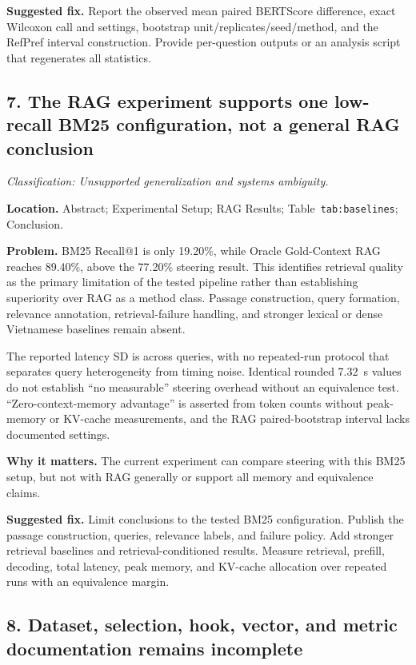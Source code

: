 \documentclass[11pt]{article}
\newcommand{\findinglabel}[1]{\textbf{#1}}
\newcommand{\classification}[1]{\textit{Classification: #1.}}
\begin{document}
\findinglabel{Suggested fix.} Report the observed mean paired BERTScore difference, exact Wilcoxon call and settings, bootstrap unit/replicates/seed/method, and the RefPref interval construction.  Provide per-question outputs or an analysis script that regenerates all statistics.

\subsection*{7. The RAG experiment supports one low-recall BM25 configuration, not a general RAG conclusion}

\classification{Unsupported generalization and systems ambiguity}

\findinglabel{Location.} Abstract; Experimental Setup; RAG Results; Table~\texttt{tab:baselines}; Conclusion.

\findinglabel{Problem.} BM25 Recall@1 is only 19.20\%, while Oracle Gold-Context RAG reaches 89.40\%, above the 77.20\% steering result.  This identifies retrieval quality as the primary limitation of the tested pipeline rather than establishing superiority over RAG as a method class.  Passage construction, query formation, relevance annotation, retrieval-failure handling, and stronger lexical or dense Vietnamese baselines remain absent.

The reported latency SD is across queries, with no repeated-run protocol that separates query heterogeneity from timing noise.  Identical rounded 7.32~s values do not establish ``no measurable'' steering overhead without an equivalence test.  ``Zero-context-memory advantage'' is asserted from token counts without peak-memory or KV-cache measurements, and the RAG paired-bootstrap interval lacks documented settings.

\findinglabel{Why it matters.} The current experiment can compare steering with this BM25 setup, but not with RAG generally or support all memory and equivalence claims.

\findinglabel{Suggested fix.} Limit conclusions to the tested BM25 configuration.  Publish the passage construction, queries, relevance labels, and failure policy.  Add stronger retrieval baselines and retrieval-conditioned results.  Measure retrieval, prefill, decoding, total latency, peak memory, and KV-cache allocation over repeated runs with an equivalence margin.

\subsection*{8. Dataset, selection, hook, vector, and metric documentation remains incomplete}
\end{document}
